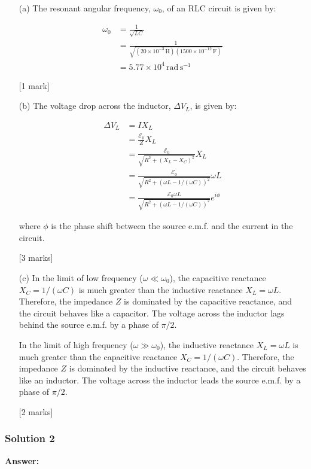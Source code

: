 \documentclass{article}
\begin{document}
\begin{enumerate}
\item[(a)] The resonant angular frequency, $\omega_0$, of an RLC circuit is given by:

\begin{align*}
\omega_0 &= \frac{1}{\sqrt{LC}} \\
&= \frac{1}{\sqrt{(20 \times 10^{-3}\,\mathrm{H})(1500 \times 10^{-12}\,\mathrm{F})}} \\
&= 5.77 \times 10^4\,\mathrm{rad\,s^{-1}}
\end{align*}

[1 mark]

\item[(b)] The voltage drop across the inductor, $\Delta V_L$, is given by:

\begin{align*}
\Delta V_L &= I X_L \\
&= \frac{\mathcal{E}_0}{Z} X_L \\
&= \frac{\mathcal{E}_0}{\sqrt{R^2 + (X_L - X_C)^2}} X_L \\
&= \frac{\mathcal{E}_0}{\sqrt{R^2 + (\omega L - 1/(\omega C))^2}} \omega L \\
&= \frac{\mathcal{E}_0 \omega L}{\sqrt{R^2 + (\omega L - 1/(\omega C))^2}} e^{i \phi}
\end{align*}

where $\phi$ is the phase shift between the source e.m.f. and the current in the circuit.

[3 marks]

\item[(c)] In the limit of low frequency ($\omega \ll \omega_0$), the capacitive reactance $X_C = 1/(\omega C)$ is much greater than the inductive reactance $X_L = \omega L$.  Therefore, the impedance $Z$ is dominated by the capacitive reactance, and the circuit behaves like a capacitor.  The voltage across the inductor lags behind the source e.m.f. by a phase of $\pi/2$.

In the limit of high frequency ($\omega \gg \omega_0$), the inductive reactance $X_L = \omega L$ is much greater than the capacitive reactance $X_C = 1/(\omega C)$.  Therefore, the impedance $Z$ is dominated by the inductive reactance, and the circuit behaves like an inductor.  The voltage across the inductor leads the source e.m.f. by a phase of $\pi/2$.

[2 marks]
\end{enumerate}

\subsubsection{Solution 2}
\textbf{Answer:}
\end{document}
